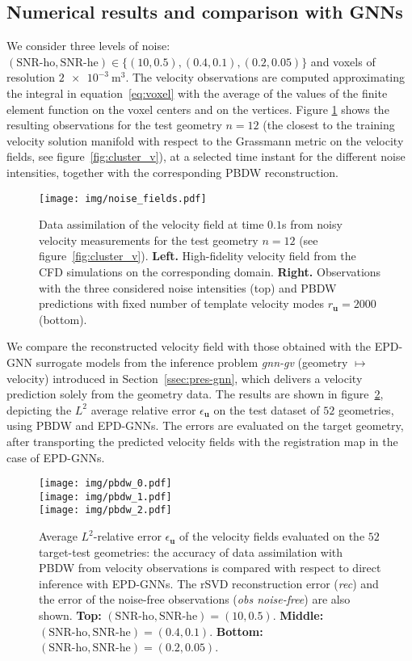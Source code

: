 \subsection{Numerical results and comparison with GNNs}
We consider three levels of noise: $(\text{SNR-ho}, \text{SNR-he})\in \{(10, 0.5), (0.4, 0.1), (0.2, 0.05)\}$ and voxels of resolution $\SI{2e-3}{\meter^3}$.
The velocity observations are computed approximating the integral in equation~\eqref{eq:voxel} with the average of the values of the finite element function on the voxel centers and on the vertices.
Figure \ref{fig:noise_pbdw} shows the resulting observations for the test geometry $n=12$
(the closest to the training velocity solution manifold with respect to the Grassmann metric on the velocity fields, see figure~\ref{fig:cluster_v}),
at a selected time instant for the different noise intensities, together with the corresponding PBDW reconstruction.
%
\begin{figure}[!htp]
  \centering
  \texttt{[image: img/noise\_fields.pdf]}
  \caption{Data assimilation of the velocity field at time $0.1$s from noisy velocity measurements for the test geometry $n=12$ (see figure~\ref{fig:cluster_v}). 
\textbf{Left.} High-fidelity velocity field from the CFD simulations on the corresponding domain. 
\textbf{Right.} Observations with the three considered noise intensities (top) and PBDW predictions with fixed number of template velocity modes $r_{\mathbf u} = 2000$ (bottom).}
  \label{fig:noise_pbdw}
\end{figure}

We compare the reconstructed velocity field with those obtained with the EPD-GNN surrogate models from the inference problem \textit{gnn-gv} (geometry $\mapsto$ velocity) introduced in Section~\ref{ssec:pres-gnn}, which delivers a velocity prediction solely from the geometry data.
The results are shown in figure~\ref{fig:pbdw_vs_gnn_v}, depicting the $L^2$ average relative error $\epsilon_{\mathbf u}$ on the test dataset of $52$ geometries, using PBDW and EPD-GNNs.
The errors are evaluated on the target geometry, after transporting the predicted velocity fields with the registration map in the case of EPD-GNNs.
\begin{figure}[!ht]
  \centering
  \texttt{[image: img/pbdw\_0.pdf]}\\
  \texttt{[image: img/pbdw\_1.pdf]}\\
  \texttt{[image: img/pbdw\_2.pdf]}\\
  \caption{Average $L^2$-relative error $\epsilon_{\mathbf u}$ of the velocity fields evaluated on the $52$ target-test geometries: the accuracy of data assimilation with PBDW from velocity observations is compared with respect to direct inference with EPD-GNNs. The rSVD reconstruction error (\textit{rec}) and the error of the noise-free observations (\textit{obs noise-free}) are also shown. \textbf{Top: } $(\text{SNR-ho}, \text{SNR-he})=(10, 0.5)$. \textbf{Middle: } $(\text{SNR-ho}, \text{SNR-he})=(0.4, 0.1)$. \textbf{Bottom: } $(\text{SNR-ho}, \text{SNR-he})=(0.2, 0.05)$.}
  \label{fig:pbdw_vs_gnn_v}
\end{figure}

